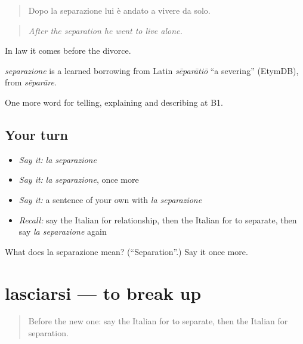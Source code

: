 \begin{quote}
Dopo la separazione lui è andato a vivere da solo.
\end{quote}

\begin{quote}
\emph{After the separation he went to live alone.}
\end{quote}

In law it comes before the divorce.

\begin{cousinweb}
\emph{separazione} is a learned borrowing from Latin \emph{sēparātiō} \textquotedblleft{}a severing\textquotedblright{} (EtymDB), from \emph{sēparāre}.
\end{cousinweb}

\begin{grammarlens}[title={What you've built}]
One more word for telling, explaining and describing at B1.
\end{grammarlens}

\subsection*{Your turn}
\begin{itemize}
\raggedright
  \item \emph{Say it:} \emph{la separazione}
  \item \emph{Say it:} \emph{la separazione}, once more
  \item \emph{Say it:} a sentence of your own with \emph{la separazione}
  \item \emph{Recall:} say the Italian for relationship, then the Italian for to separate, then say \emph{la separazione} again
\end{itemize}

\begin{tcolorbox}[breakable,colback=teal!4,colframe=teal!35!black,title={Before you move on}]
What does la separazione mean? (\textquotedblleft{}Separation\textquotedblright{}.) Say it once more.
\end{tcolorbox}
\section[lasciarsi]{lasciarsi — to break up}

\label{lesson:IT-C494-lasciarsi}



\begin{quote}
Before the new one: say the Italian for to separate, then the Italian for separation.
\end{quote}

